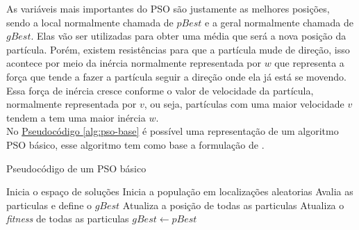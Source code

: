 \indent As variáveis mais importantes do PSO são justamente as melhores posições, sendo a local normalmente chamada de $pBest$ e a geral normalmente chamada de $gBest$. Elas vão ser utilizadas para obter uma média que será a nova posição da partícula. Porém, existem resistências para que a partícula mude de direção, isso acontece por meio da inércia normalmente representada por $w$ que representa a força que tende a fazer a partícula seguir a direção onde ela já está se movendo. Essa força de inércia cresce conforme o valor de velocidade da partícula, normalmente representada por $v$, ou seja, partículas com uma maior velocidade $v$ tendem a tem uma maior inércia $w$.\\
\indent No \hyperref[alg:pso-base]{Pseudocódigo \ref{alg:pso-base}} 
é possível uma representação de um algoritmo PSO básico, esse algoritmo tem como base a formulação de \cite{martinez2009}.
\begin{algorithm}
    \caption{Pseudocódigo de um PSO básico}\label{alg:pso-base}
\begin{algorithmic}
\State Inicia o espaço de soluções
\State Inicia a população em localizações aleatorias
\State Avalia as particulas e define o $gBest$
  \State Atualiza a posição de todas as particulas
  \State Atualiza o \textit{fitness} de todas as particulas
    \State $gBest \gets pBest$
\EndIf
\EndWhile

\end{algorithmic}
\end{algorithm}



